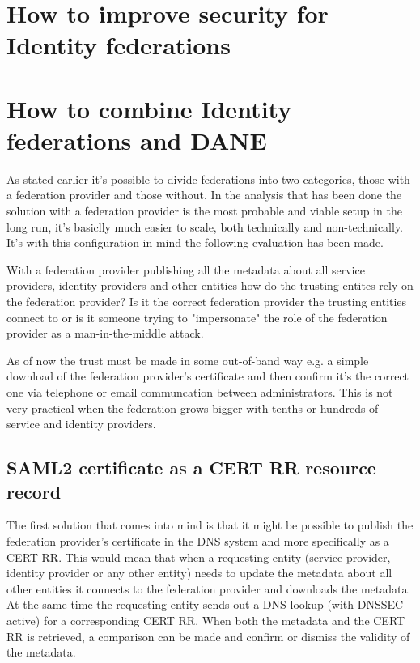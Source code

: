 \section{How to improve security for Identity federations}
\section{How to combine Identity federations and DANE}
As stated earlier it's possible to divide federations into two categories, those with a federation provider and those without.
In the analysis that has been done the solution with a federation provider is the most probable and viable setup in the long run, it's basiclly much easier to scale, both technically and non-technically.
It's with this configuration in mind the following evaluation has been made.


With a federation provider publishing all the metadata about all service providers, identity providers and other entities how do the trusting entites rely on the federation provider?
Is it the correct federation provider the trusting entities connect to or is it someone trying to "impersonate" the role of the federation provider as a man-in-the-middle attack.

As of now the trust must be made in some out-of-band way e.g. a simple download of the federation provider's certificate and then confirm it's the correct one via telephone or email communcation between administrators.
This is not very practical when the federation grows bigger with tenths or hundreds of service and identity providers.

\subsection{SAML2 certificate as a CERT RR resource record}
\label{subsec:saml2-certificate-as-tlsa}
The first solution that comes into mind is that it might be possible to publish the federation provider's certificate in the DNS system and more specifically as a CERT RR\cite{rfc:4398}.
This would mean that when a requesting entity (service provider, identity provider or any other entity) needs to update the metadata about all other entities it connects to the federation provider and downloads the metadata.
At the same time the requesting entity sends out a DNS lookup (with DNSSEC active) for a corresponding CERT RR.
When both the metadata and the CERT RR is retrieved, a comparison can be made and confirm or dismiss the validity of the metadata.

